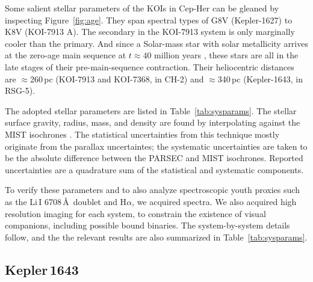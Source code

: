 \documentclass[12pt,twocolumn,linenumbers]{aastex63}
\begin{document}


Some salient stellar parameters of the KOIs in Cep-Her can be gleaned
by inspecting Figure~\ref{fig:age}.  They span spectral types of G8V
(Kepler-1627) to K8V (KOI-7913 A).  The secondary in the KOI-7913
system is only marginally cooler than the primary.  And since a
Solar-mass star with solar metallicity arrives at the zero-age main
sequence at $t\approx40$ million years \citep{choi_mesa_2016}, these
stars are all in the late stages of their pre-main-sequence
contraction.  Their heliocentric distances are $\approx$260\,pc
(KOI-7913 and KOI-7368, in CH-2) and $\approx$340\,pc (Kepler-1643, in
RSG-5).

The adopted stellar parameters are listed in
Table~\ref{tab:sysparams}.  The stellar surface gravity, radius,
mass, and density are found by interpolating against the MIST
isochrones \citep{choi_mesa_2016}.  The statistical uncertainties from
this technique mostly originate from the parallax uncertaintes; the
systematic uncertainties are taken to be the absolute difference
between the PARSEC \citep{bressan_parsec_2012} and MIST isochrones.
Reported uncertainties are a quadrature sum of the statistical and
systematic components. 

To verify these parameters and to also analyze spectroscopic youth
proxies such as the Li\,\textsc{I} 6708\,\AA\ doublet and H$\alpha$,
we acquired spectra.  We also acquired high resolution imaging for
each system, to constrain the existence of visual companions,
including possible bound binaries.  The system-by-system details
follow, and the the relevant results are also summarized in
Table~\ref{tab:sysparams}.

\subsection{Kepler\,1643}
\end{document}
